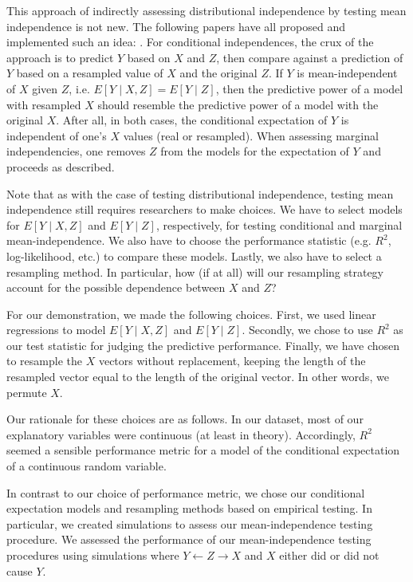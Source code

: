 This approach of indirectly assessing distributional independence by testing mean independence is not new.
The following papers have all proposed and implemented such an idea: \citet{burkart_2017_predictive, chalupka_2018_fast, inacio_2019_conditional}.
For conditional independences, the crux of the approach is to predict $Y$ based on $X$ and $Z$, then compare against a prediction of $Y$ based on a resampled value of $X$ and the original $Z$.
If $Y$ is mean-independent of $X$ given $Z$, i.e. $E \left[ Y \mid X, Z \right] = E\left[ Y \mid Z \right]$, then the predictive power of a model with resampled $X$ should resemble the predictive power of a model with the original $X$.
After all, in both cases, the conditional expectation of $Y$ is independent of one's $X$ values (real or resampled).
When assessing marginal independencies, one removes $Z$ from the models for the expectation of $Y$ and proceeds as described.

Note that as with the case of testing distributional independence, testing mean independence still requires researchers to make choices.
We have to select models for $E \left[ Y \mid X, Z \right]$ and $E\left[ Y \mid Z \right]$, respectively, for testing conditional and marginal mean-independence.
We also have to choose the performance statistic (e.g. $R^2$, log-likelihood, etc.) to compare these models.
Lastly, we also have to select a resampling method.
In particular, how (if at all) will our resampling strategy account for the possible dependence between $X$ and $Z$?


For our demonstration, we made the following choices.
First, we used linear regressions to model $E \left[Y \mid X, Z \right]$ and $E \left[ Y \mid Z \right]$.
Secondly, we chose to use $R^2$ as our test statistic for judging the predictive performance.
Finally, we have chosen to resample the $X$ vectors without replacement, keeping the length of the resampled vector equal to the length of the original vector.
In other words, we permute $X$.

Our rationale for these choices are as follows.
In our dataset, most of our explanatory variables were continuous (at least in theory).
Accordingly, $R^2$ seemed a sensible performance metric for a model of the conditional expectation of a continuous random variable.

In contrast to our choice of performance metric, we chose our conditional expectation models and resampling methods based on empirical testing.
In particular, we created simulations to assess our mean-independence testing procedure.
We assessed the performance of our mean-independence testing procedures using simulations where $Y \leftarrow Z \rightarrow X$ and $X$ either did or did not cause $Y$.

